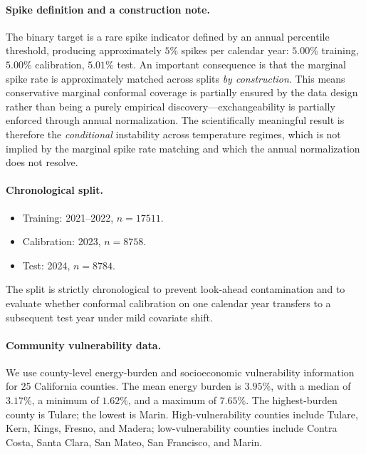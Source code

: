 \documentclass{article}
\begin{document}
\paragraph{Spike definition and a construction note.}
The binary target is a rare spike indicator defined by an annual percentile
threshold, producing approximately $5\%$ spikes per calendar year:
$5.00\%$ training, $5.00\%$ calibration, $5.01\%$ test. An important
consequence is that the marginal spike rate is approximately matched across
splits \emph{by construction}. This means conservative marginal conformal
coverage is partially ensured by the data design rather than being a purely
empirical discovery---exchangeability is partially enforced through annual
normalization. The scientifically meaningful result is therefore the
\emph{conditional} instability across temperature regimes, which is not
implied by the marginal spike rate matching and which the annual normalization
does not resolve.

\paragraph{Chronological split.}
\begin{itemize}
    \item Training: 2021--2022, $n = \num{17511}$.
    \item Calibration: 2023, $n = \num{8758}$.
    \item Test: 2024, $n = \num{8784}$.
\end{itemize}
The split is strictly chronological to prevent look-ahead contamination and
to evaluate whether conformal calibration on one calendar year transfers to a
subsequent test year under mild covariate shift.

\paragraph{Community vulnerability data.}
We use county-level energy-burden and socioeconomic vulnerability information
for \num{25} California counties. The mean energy burden is $3.95\%$, with a
median of $3.17\%$, a minimum of $1.62\%$, and a maximum of $7.65\%$. The
highest-burden county is Tulare; the lowest is Marin. High-vulnerability
counties include Tulare, Kern, Kings, Fresno, and Madera; low-vulnerability
counties include Contra Costa, Santa Clara, San Mateo, San Francisco, and
Marin.
\end{document}
